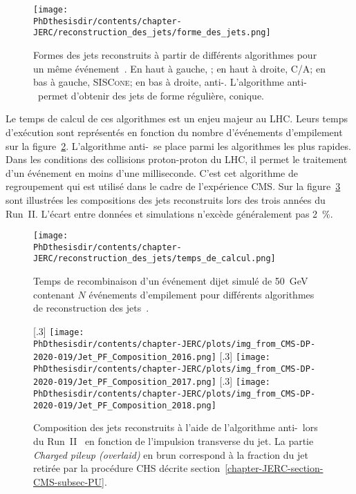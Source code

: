 \begin{figure}[h]
\centering
\texttt{[image: \\PhDthesisdir/contents/chapter-JERC/reconstruction\_des\_jets/forme\_des\_jets.png]}
\caption[Formes des jets reconstruits à partir de différents algorithmes.]{Formes des jets reconstruits à partir de différents algorithmes pour un même événement~\cite{Cacciari_antikT}. En haut à gauche, \kT; en haut à droite, C/A; en bas à gauche, \textsc{SISCone}; en bas à droite, anti-\kT. L'algorithme anti-\kT\ permet d'obtenir des jets de forme régulière, conique.}
\label{fig-chapter-JERC-section-jets_reco-subsec-algo-examples}
\end{figure}
\par Le temps de calcul de ces algorithmes est un enjeu majeur au LHC.
Leurs temps d'exécution sont représentés en fonction du nombre d'événements d'empilement sur la figure~\ref{fig-chapter-JERC-section-jets_reco-subsec-algo-perfs}.
L'algorithme anti-\kT\ se place parmi les algorithmes les plus rapides.
Dans les conditions des collisions proton-proton du LHC, il permet le traitement d'un événement en moins d'une milliseconde.
C'est cet algorithme de regroupement qui est utilisé dans le cadre de l'expérience CMS.
Sur la figure~\ref{fig-Jet_PF_Composition_RunII} sont illustrées les compositions des jets reconstruits lors des trois années du Run~II. L'écart entre données et simulations n'excède généralement pas \SI{2}{\%}.
\begin{figure}[h]
\centering
\texttt{[image: \\PhDthesisdir/contents/chapter-JERC/reconstruction\_des\_jets/temps\_de\_calcul.png]}
\caption[Temps de recombinaison d'un événement dijet.]{Temps de recombinaison d'un événement dijet simulé de \SI{50}{\GeV} contenant $N$ événements d'empilement pour différents algorithmes de reconstruction des jets~\cite{towards_jetography}.}
\label{fig-chapter-JERC-section-jets_reco-subsec-algo-perfs}
\end{figure}
\begin{figure}[h]
\centering
{}[.3\textwidth]
{\texttt{[image: \\PhDthesisdir/contents/chapter-JERC/plots/img\_from\_CMS-DP-2020-019/Jet\_PF\_Composition\_2016.png]}}
\hfill
{}[.3\textwidth]
{\texttt{[image: \\PhDthesisdir/contents/chapter-JERC/plots/img\_from\_CMS-DP-2020-019/Jet\_PF\_Composition\_2017.png]}}
\hfill
{}[.3\textwidth]
{\texttt{[image: \\PhDthesisdir/contents/chapter-JERC/plots/img\_from\_CMS-DP-2020-019/Jet\_PF\_Composition\_2018.png]}}
\caption[Compositions des jets reconstruits lors du Run~II.]{Composition des jets reconstruits à l'aide de l'algorithme anti-\kT\ lors du Run~II~\cite{CMS-DP-2020-019} en fonction de l'impulsion transverse du jet. La partie \emph{Charged pileup (overlaid)} en brun correspond à la fraction du jet retirée par la procédure CHS décrite section~\ref{chapter-JERC-section-CMS-subsec-PU}.}
\label{fig-Jet_PF_Composition_RunII}
\end{figure}
